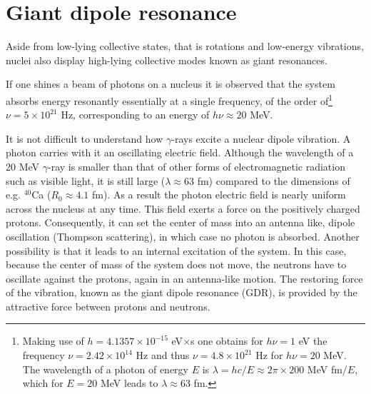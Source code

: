 \section{Giant dipole resonance}\label{S1.5}
Aside from low-lying collective states, that is rotations and low-energy vibrations, nuclei also display high-lying collective modes known as giant resonances.


If one shines a beam of photons on a nucleus it is observed that the system 
absorbs energy resonantly essentially at a single frequency, of the order of\footnote{Making use of $h=4.1357\times10^{-15}$ eV$\times$s one obtains for $h\nu=1$ eV the frequency $\nu=2.42\times10^{14}$ Hz and thus $\nu=4.8\times10^{21}$ Hz for $h\nu=20$ MeV. The wavelength of a photon of energy $E$ is $\lambda=hc/E\approx2\pi\times200$ MeV fm/$E$, which for $E=20$ MeV leads to $\lambda\approx63$ fm.} $\nu=5\times10^{21}$ Hz, corresponding to an energy of $h\nu\approx20$ MeV.

It is not difficult to understand how $\gamma$-rays excite a nuclear dipole vibration. A photon carries with it an oscillating electric field. Although the wavelength of a 20 MeV $\gamma$-ray is smaller than that of other forms of electromagnetic radiation such as visible light, it is still large ($\lambda\approx63$ fm) compared to the dimensions of e.g. $^{40}$Ca ($R_0\approx4.1$ fm). As a result the photon electric field is nearly uniform across the nucleus at any time. This field exerts a force on the positively charged protons. Consequently, it can set the center of mass into an antenna like, dipole oscillation (Thompson scattering), in which case no photon is absorbed. Another possibility is that it leads to an internal excitation of the system. In this case, because the center of mass of the system does not move, the neutrons have to oscillate against the protons, again in an antenna-like motion. The restoring force of the vibration, known as the giant dipole resonance (GDR), is provided by the attractive force between protons and neutrons.

